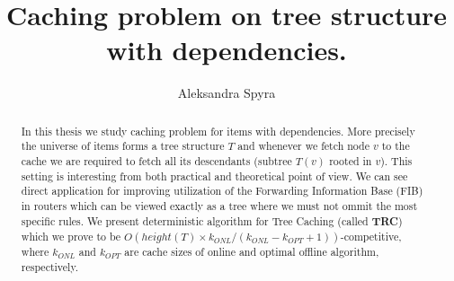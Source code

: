 \documentclass[a4paper,10pt]{article}
\title{Caching problem on tree structure with dependencies.}
\author{Aleksandra Spyra}
\begin{document}
\maketitle

\begin{abstract}
In this thesis we study caching problem for items with dependencies.
More precisely the universe of items forms a tree structure $T$ and whenever
we fetch node $v$ to the cache we are required to fetch all its descendants
(subtree $T(v)$ rooted in $v$). This setting is interesting from both practical 
and theoretical point of view. We can see direct application for improving 
utilization of the Forwarding Information Base (FIB) in routers which can be 
viewed exactly as a tree where we must not ommit the most specific rules. We 
present deterministic algorithm for Tree Caching (called \textbf{TRC}) which we 
prove to be $O(height(T) \times k_{ONL}/(k_{ONL} - k_{OPT} + 1))$-competitive, 
where $k_{ONL}$ and $k_{OPT}$ are cache sizes of online and optimal offline 
algorithm, respectively. 
\end{abstract}

\tableofcontents






\end{document}
